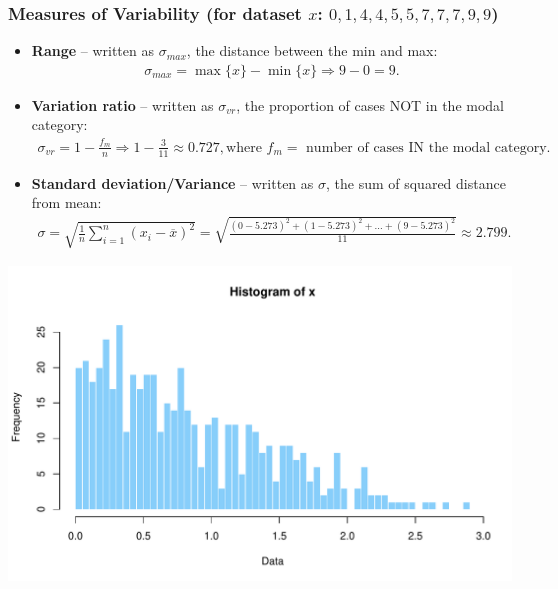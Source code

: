 \documentclass[aspectratio=169]{beamer}
\theoremstyle{principle}
\begin{document}
\begin{frame}
\frametitle{Measures of Variability (for dataset $x$: $0, 1, 4, 4, 5, 5, 7, 7, 7, 9, 9$)}
\begin{itemize}

\item[]\color{white} \textbf{Range} -- written as $\sigma_{max}$, the distance between the min and max: 
\begin{align*}
\sigma_{max} = \max\{x\} - \min\{x\} \Longrightarrow 9 - 0 = 9.
\end{align*}

\item[]\color{white} \textbf{Variation ratio} -- written as $\sigma_{vr}$, the proportion of cases NOT in the modal category:
\begin{align*}
\sigma_{vr} = 1 - \frac{f_m}{n}\Longrightarrow 1 - \frac{3}{11} \approx 0.727, \mbox{where  }f_m =\mbox{ number of cases IN the modal category}.
\end{align*}

\item \color{black} \textbf{Standard deviation/Variance} -- written as $\sigma$, the sum of squared distance from mean:
\begin{align*}
\sigma = \sqrt{\frac{1}{n}\sum_{i=1}^n(x_i - \overline{x})^2} = \sqrt{\frac{(0 - 5.273)^2 + (1 - 5.273)^2 + \hdots + (9 - 5.273)^2}{11}}\approx 2.799.
\end{align*}

\end{itemize}
\end{frame}






\begin{frame}
\begin{center}
\includegraphics[scale=0.65]{histogram.pdf}
\end{center}
\end{frame}
\end{document}
